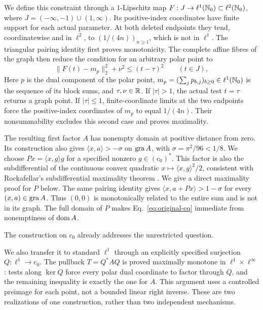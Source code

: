 We define this constraint through a $1$-Lipschitz map
$F:J\to\ell^1(\mathbb N_0)\subset\ell^2(\mathbb N_0)$, where
$J=(-\infty,-1)\cup(1,\infty)$. Its positive-index coordinates have finite
support for each actual parameter. At both deleted endpoints they tend,
coordinatewise and in $\ell^2$, to
$(1/(4n))_{n\ge1}$, which is not in $\ell^1$.
The triangular pairing identity first proves monotonicity. The complete
affine fibres of the graph then reduce the condition for an arbitrary
polar point to
\begin{equation}
\|F(t)-m_p\|_2^2+\nu^2\le(t-\tau)^2
\qquad(t\in J),
\label{eq:polar-intro}
\end{equation}
Here $p$ is the dual component of the polar point,
$m_p=(\sum_j p_{b,j})_{b\ge0}\in\ell^1(\mathbb N_0)$ is the sequence of its block
sums, and $\tau,\nu\in\mathbb R$. If $|\tau|>1$, the actual test $t=\tau$ returns a graph
point. If $|\tau|\le1$, finite-coordinate limits at the two endpoints
force the positive-index coordinates of $m_p$ to equal $1/(4n)$.
Their nonsummability excludes this second case and proves maximality.

The resulting first factor $A$ has nonempty domain at positive distance
from zero. Its construction also gives
$\langle x,a\rangle>-\sigma$ on $\operatorname{gra} A$, with
$\sigma=\pi^2/96<1/8$. We choose
$Px=\langle x,g\rangle g$ for a specified nonzero $g\in(c_0)^*$.
This factor is also the subdifferential of the continuous convex quadratic
$x\mapsto\langle x,g\rangle^2/2$, consistent with Rockafellar's
subdifferential maximality theorem \cite{rockafellar1970subdiff}.
We give a direct maximality proof for $P$ below.
The same pairing identity gives
$\langle x,a+Px\rangle>1-\sigma$ for every $(x,a)\in\operatorname{gra} A$.
Thus $(0,0)$ is monotonically related to the entire sum and is not in
its graph. The full domain of $P$ makes
Eq.~\eqref{eq:original-cq} immediate from nonemptiness of $\operatorname{dom} A$.

The construction on $c_0$ already addresses the unrestricted question.

We also transfer it to standard $\ell^1$ through an explicitly specified
surjection $Q:\ell^1\to c_0$. The pullback $T=Q^*AQ$ is proved maximally
monotone in $\ell^1\times\ell^\infty$: tests along $\ker Q$ force every
polar dual coordinate to factor through $Q$, and the remaining inequality
is exactly the one for $A$. This argument uses a controlled preimage for
each point, not a bounded linear right inverse.
These are two realizations of one construction, rather than two independent
mechanisms.

